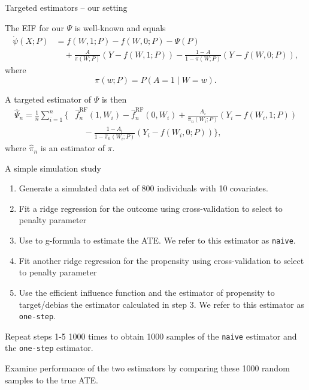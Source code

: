 \documentclass[smaller]{beamer}\usepackage{listings}
\newcommand{\1}{\mathds{1}}
\begin{document}
\begin{frame}[label={sec:org356079f}]{Targeted estimators -- our setting}
\small

The EIF for our \(\Psi\) is well-known
\citep[e.g.,][]{kennedy2016semiparametric,kennedy2022semiparametric,hines2022demystifying}
and equals
\begin{align*}
  \dot{\psi}(X; P)
  & = f(W, 1; P) - f(W, 0;P)
    - \Psi(P)
  \\
  & \quad
    + \frac{A}{\pi(W;P)}(Y - f(W, 1; P))
    - \frac{1-A}{1-\pi(W;P)}(Y - f(W, 0;P)),
\end{align*}
where
\begin{equation*}
  \pi(w; P) = P(A=1 \mid W=w).
\end{equation*}

\vfill

A targeted estimator of \(\Psi\) is then
\begin{align*}
  \hat{\Psi}_n= 
  \frac{1}{n}\sum_{i=1}^{n}
  \Big\{
  &
    \hat{f}_n^{\text{RF}}(1, W_i) - \hat{f}_n^{\text{RF}}(0, W_i)
    + \frac{A_i}{\hat{\pi}_n(W_i;P)}(Y_i - f(W_i, 1; P))
  \\
  & \quad
    - \frac{1-A_i}{1-\hat{\pi}_n(W_i;P)}(Y_i - f(W_i, 0;P))
    \Big\},
\end{align*}
where $\hat{\pi}_n$ is an estimator of $\pi$.
\end{frame}



\begin{frame}[label={sec:org1b72ee4},fragile]{A simple simulation study}
 \begin{enumerate}
\item Generate a simulated data set of 800 individuals with 10 covariates.
\item Fit a ridge regression for the outcome using cross-validation to select
to penalty parameter
\item Use to g-formula to estimate the ATE. We refer to this estimator as \texttt{naive}.
\item Fit another ridge regression for the propensity using cross-validation to select to penalty
parameter
\item Use the efficient influence function and the estimator of propensity to target/debias
the estimator calculated in step 3. We refer to this estimator as \texttt{one-step}.
\end{enumerate}


\vfill

Repeat steps 1-5 1000 times to obtain 1000 samples of the \texttt{naive} estimator and
the \texttt{one-step} estimator.

\vfill

Examine performance of the two estimators by comparing these 1000 random samples
to the true ATE.
\end{frame}
\end{document}
